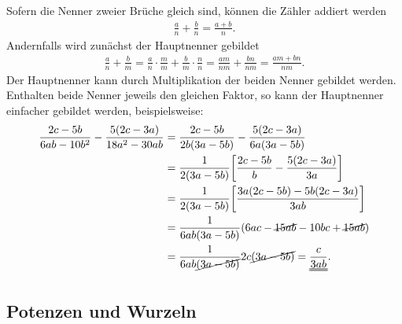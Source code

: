 Sofern die Nenner zweier Brüche gleich sind, können die Zähler addiert werden 
\begin{align}
    \frac{a}{n}+\frac{b}{n} = \frac{a+b}{n}.
\end{align}
Andernfalls wird zunächst der Hauptnenner gebildet 
\begin{align}
    \frac{a}{n}+\frac{b}{m} = \frac{a}{n} \cdot \frac{m}{m} + \frac{b}{m}\cdot \frac{n}{n} = \frac{am}{nm} + \frac{bn}{nm} = \frac{am + bn}{nm}.
\end{align}
Der Hauptnenner kann durch Multiplikation der beiden Nenner gebildet werden. Enthalten beide Nenner jeweils den gleichen Faktor, so kann der Hauptnenner einfacher gebildet werden, beispielsweise: 
\begin{align}
    \frac{2c-5b}{6ab - 10b^2} - \frac{5(2c-3a)}{18a^2 -30ab} &= \frac{2c-5b}{2b(3a-5b)} - \frac{5(2c-3a)}{6a(3a-5b)} \notag \\
    &= \frac{1}{2(3a-5b)} \qty[\frac{2c-5b}{b}-\frac{5(2c-3a)}{3a}] \notag \\
    &= \frac{1}{2(3a-5b)} \qty[\frac{3a(2c-5b) -5b(2c-3a)}{3ab}] \notag \\
    &= \frac{1}{6ab(3a-5b)}\qty(6ac -\cancel{15ab} -10bc +\cancel{15ab}) \notag \\
    &= \frac{1}{6ab\cancel{(3a-5b)}} 2c\cancel{(3a-5b)} = \uuline{\frac{c}{3ab}}.
\end{align}

\subsection{Potenzen und Wurzeln}

